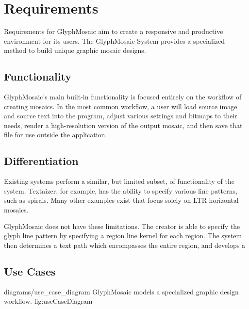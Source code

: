 \section{Requirements}
Requirements for GlyphMosaic aim to create a responsive and productive environment for its users.
The GlyphMosaic System provides a specialized method to build unique graphic mosaic designs.


\subsection{Functionality}
GlyphMosaic’s main built-in functionality is focused entirely on the workflow of creating mosaics.
In the most common workflow, a user will load source image and source text into the program, adjust various settings and bitmaps to their needs, render a high-resolution version of the output mosaic, and then save that file for use outside the application.

\subsection{Differentiation}
Existing systems perform a similar, but limited subset, of functionality of the system.
Textaizer\cite{textaizer}, for example, has the ability to specify various line patterns, such as spirals.
Many other examples exist that focus solely on LTR horizontal mosaics.

GlyphMosaic does not have these limitations.
The creator is able to specify the glyph line pattern by specifying a region line kernel for each region.
The system then determines a text path which encompasses the entire region, and develops a

\subsection{Use Cases}
\label{sec:use_cases}

\begin{itemize}
\end{itemize}

\sidiagram
{diagrams/use_case_diagram}
{GlyphMosaic models a specialized graphic design workflow.}
{fig:useCaseDiagram}
{\diagsize}